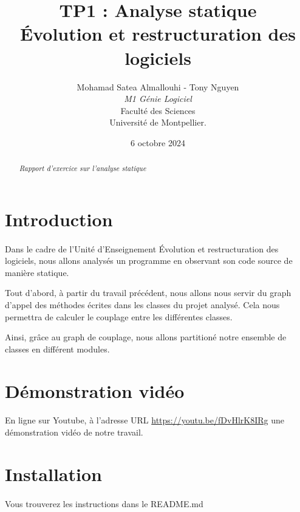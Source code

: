 \documentclass[a4paper]{article}
\title{  TP1 : Analyse statique\\Évolution et restructuration des logiciels}
\author{Mohamad Satea Almallouhi - Tony Nguyen\\\emph{M1 Génie Logiciel}\\Faculté des Sciences\\Université de Montpellier.}
\date{6 octobre 2024}
\begin{document}
    \maketitle
    \begin{center}
    \end{center}

    \begin{abstract}     %
      \emph{Rapport d'exercice sur l'analyse statique}
    \end{abstract}
    \newpage
    \tableofcontents
    \section*{Introduction}
            \paragraph{}
                Dans le cadre de l'Unité d'Enseignement Évolution et restructuration des logiciels, nous allons analysés un programme en observant son code source de manière statique.

                Tout d'abord, à partir du travail précédent, nous allons nous servir du graph d'appel des méthodes écrites dans les classes du projet analysé. Cela nous permettra de calculer le couplage entre les différentes classes.

                Ainsi, grâce au graph de couplage, nous allons partitioné notre ensemble de classes en différent modules.
        \section*{Démonstration vidéo}
            \paragraph{}
                En ligne sur Youtube, à l'adresse URL \url{https://youtu.be/fDvHlrK8IRg} une démonstration vidéo de notre travail.
        \section*{Installation}
            \paragraph{}
                Vous trouverez les instructions dans le README.md
\end{document}
